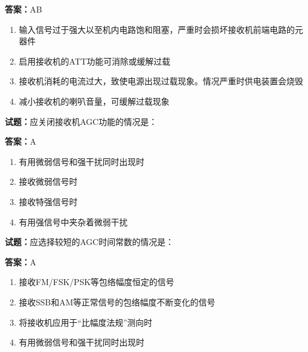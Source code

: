 \documentclass{ctexbook}
\begin{document}
\textbf{答案：}AB 

\begin{enumerate}[leftmargin=3em]
  \item 输入信号过于强大以至机内电路饱和阻塞，严重时会损坏接收机前端电路的元器件 

  \item 启用接收机的ATT功能可消除或缓解过载 

  \item 接收机消耗的电流过大，致使电源出现过载现象。情况严重时供电装置会烧毁 

  \item 减小接收机的喇叭音量，可缓解过载现象 

\end{enumerate}





\vspace{1em}

\textbf{试题：}应关闭接收机AGC功能的情况是： 

\textbf{答案：}A 

\begin{enumerate}[leftmargin=3em]
  \item 有用微弱信号和强干扰同时出现时 

  \item 接收微弱信号时 

  \item 接收特强信号时 

  \item 有用强信号中夹杂着微弱干扰 

\end{enumerate}






\vspace{1em}

\textbf{试题：}应选择较短的AGC时间常数的情况是： 

\textbf{答案：}A 

\begin{enumerate}[leftmargin=3em]
  \item 接收FM/FSK/PSK等包络幅度恒定的信号 

  \item 接收SSB和AM等正常信号的包络幅度不断变化的信号 

  \item 将接收机应用于“比幅度法规”测向时 

  \item 有用微弱信号和强干扰同时出现时 

\end{enumerate}
\end{document}
